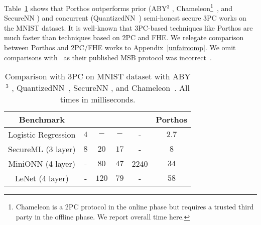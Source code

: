 Table~\ref{tab:porthosvspriormnist} shows that Porthos outperforms prior (ABY$^3$ \cite{aby3}, Chameleon\footnote{Chameleon is a 2PC protocol in the online phase but requires a trusted third party in the offline phase. We report overall time here.}~\cite{chameleon}, and SecureNN \cite{securenn}) and concurrent (QuantizedNN~\cite{quantizednn}) semi-honest secure 3PC works on the MNIST dataset. 
It is well-known that 3PC-based techniques like Porthos are much faster than techniques based on 2PC and FHE. We relegate comparison between Porthos and 2PC/FHE
works to Appendix~\ref{unfaircomp}. We omit comparisons with~\cite{trident,astraccsw} as their published MSB protocol was incorrect~\cite{astraeprint}.
%

\begin{table}
  \centering

      \begin{tabular}{|c|c|c|c|c|c|}
    \hline
    Benchmark & \cite{aby3}  & \cite{quantizednn} & \cite{securenn} & \cite{chameleon} & Porthos \\
    \hline
	Logistic Regression & $4$ & $-$ & $-$ & -  & $2.7$\\
    \hline
	SecureML (3 layer) & $8$ & $20$ & $17$ & - & $8$\\
	\hline
	MiniONN (4 layer)  & -  & $80$ & $47$ & 2240 & $34$\\
	\hline
   LeNet (4 layer) & - & $120$ & $79$ & - & $58$ \\
	\hline
\end{tabular}
 \caption{Comparison with 3PC on MNIST dataset with ABY$^3$ \cite{aby3}, QuantizedNN~\cite{quantizednn}, SecureNN \cite{securenn}, and Chameleon~\cite{chameleon}. All times in milliseconds.}
\label{tab:porthosvspriormnist}
\end{table}



